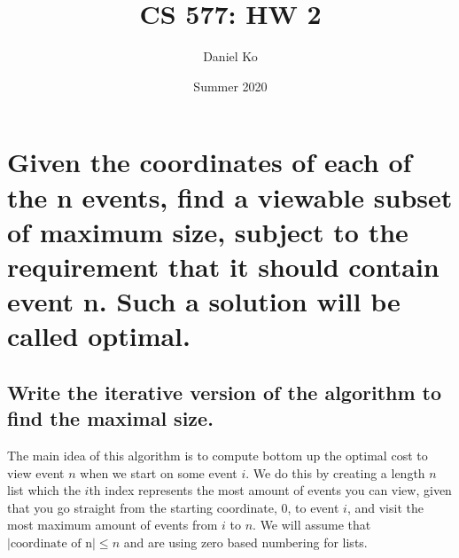 \documentclass[11pt]{scrartcl}
\title{CS 577: HW 2}
\author{Daniel Ko}
\date{Summer 2020}
\begin{document}
\maketitle

\section{
  Given the coordinates of each of the n events, find a viewable subset of
  maximum size, subject to the requirement that it should contain event n. Such a solution
  will be called optimal.
 }
\subsection{
	Write the iterative version of the algorithm to find the maximal size.
}
The main idea of this algorithm is to compute bottom up the optimal cost to view event $n$
when we start on some event $i$. We do this by creating a length $n$ list which the $i$th index represents the
most amount of events you can view, given that you go straight from the starting coordinate, 0,
to event $i$, and visit the most maximum amount of events from $i$ to $n$.
We will assume that $|\text{coordinate of n}| \leq n$ and are using zero based numbering for lists.

\begin{algorithm}
\end{algorithm}
\end{document}
